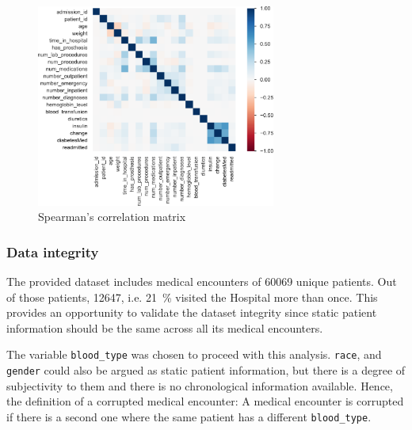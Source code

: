 \documentclass[a4paper,11pt]{article}
\newcommand{\race}{\texttt{race}\xspace}
\newcommand{\gender}{\texttt{gender}\xspace}
\newcommand{\bloodType}{\texttt{blood\_type}\xspace}
\begin{document}
\begin{figure}[!htb]
	\centering
	\includegraphics[width=0.7\textwidth]{images/correlation.pdf}
	\caption{Spearman's correlation matrix}
	\label{fig:correlation}
\end{figure}


\subsubsection{Data integrity}
\label{sec:general_analysis_data_integrity}

The provided dataset includes medical encounters of \SI{60069}{} unique patients. Out of those patients, \SI{12647}{}, i.e. \SI{21}{\percent} visited the Hospital more than once. This provides an opportunity to validate the dataset integrity since static patient information should be the same across all its medical encounters. 


The variable \bloodType was chosen to proceed with this analysis. 
\race, and \gender could also be argued as static patient information, but there is a degree of subjectivity to them and there is no chronological information available. %
Hence, the definition of a corrupted medical encounter: A medical encounter is corrupted if there is a second one where the same patient has a different \bloodType.
\end{document}
